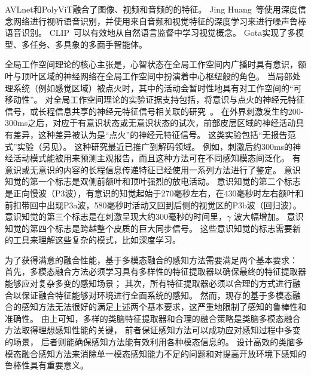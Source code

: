 \documentclass[a4paper,zihao=-4]{article}
\begin{document}
AVLnet\cite{rouditchenko2020avlnet}和PolyViT\cite{likhosherstov2021polyvit}融合了图像、视频和音频的的特征。
Jing Huang~\cite{huang2013audio}等使用深度信念网络进行视听语音识别，并使用来自音频和视觉特征的深度学习来进行噪声鲁棒语音识别。
CLIP~\cite{radford2021learning}可以有效地从自然语言监督中学习视觉概念。
Gota\cite{reed2022generalist}实现了多模型、多任务、多具象的多面手智能体。

全局工作空间理论的核心主张是，心智状态在全局工作空间内广播时具有意识，额叶与顶叶区域的神经网络在全局工作空间中扮演着中心枢纽般的角色。
当局部处理系统（例如感觉区域）被点火时，其中的活动会暂时性地具有对工作空间的“可移动性”\cite{dehaene2001towards}。
对全局工作空间理论的实验证据支持包括，将意识与点火的神经元特征信号，或长程信息共享的神经元特征信号相关联的研究~\cite{dehaene2011experimental,mashour2020conscious,demertzi2019human,van2018threshold}。
在外界刺激发生约200-300ms之后，对应于有意识状态或无意识状态的试次，前部皮层区域的神经活动具有差异，这种差异被认为是“点火”的神经元特征信号。
这类实验包括“无报告范式”实验\cite{sergent2021bifurcation}（另见\cite{sergent2005timing}）。
这种研究最近已推广到解码领域。
例如，刺激后约300ms的神经活动模式能被用来预测主观报告，而且这种方法可在不同感知模态间泛化\cite{sanchez2020decoding}。
有意识或无意识的内容的长程信息传递特征已经使用一系列方法进行了鉴定\cite{mashour2020conscious,gaillard2009converging}。
意识知觉的第一个标志是双侧前额叶和顶叶强烈的放电活动。
意识知觉的第二个标志是正向慢波（P3波），有意识的知觉起始于270毫秒左右，在430毫秒时左右额叶和前扣带回中出现P3a波，580毫秒时活动又回到后侧的视觉区的P3b波（回归波）。
意识知觉的第三个标志是在刺激呈现大约300毫秒的时间里，$ \gamma $ 波大幅增加。
意识知觉的第四个标志是跨越整个皮质的巨大同步信号。
这些意识知觉的标志需要新的工具来理解这些复杂的模式，比如深度学习。

%
为了获得满意的融合性能，基于多模态融合的感知方法需要满足两个基本要求：
首先，多模态融合方法必须学习具有多样性的特征提取器以确保最终的特征提取器能够应对复杂多变的感知场景；
其次，所有特征提取器必须以合理的方式进行融合以保证融合特征能够对环境进行全面系统的感知。
然而，现存的基于多模态融合的感知方法无法很好的满足上述两个基本要求，这严重地限制了感知的鲁棒性和准确性。
由上可知，多样的类脑特征提取器和合理的融合策略是类脑多模态融合方法取得理想感知性能的关键，
前者保证感知方法可以成功应对感知过程中多变的场景，
后者则能确保感知方法能有效利用各种模态信息的。
设计高效的类脑多模态融合感知方法来消除单一模态感知能力不足的问题和对提高开放环境下感知的鲁棒性具有重要意义。
\end{document}
